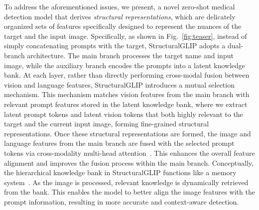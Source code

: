 To address the aforementioned issues, we present\ours, a novel zero-shot medical detection model that derives \textit{structural representations}, which are delicately organized sets of features specifically designed to represent the nuances of the target and the input image. Specifically, as shown in Fig.~\ref{fig:teaser}, instead of simply concatenating prompts with the target, StructuralGLIP adopts a dual-branch architecture. The main branch processes the target name and input image, while the auxiliary branch encodes the prompts into a latent knowledge bank. At each layer, rather than directly performing cross-modal fusion between vision and language features, StructuralGLIP introduces a mutual selection mechanism. This mechanism matches vision features from the main branch with relevant prompt features stored in the latent knowledge bank, where we extract latent prompt tokens and latent vision tokens that both highly relevant to the target and the current input image, forming fine-grained structural representations. Once these structural representations are formed, the image and language features from the main branch are fused with the selected prompt tokens via cross-modality multi-head attention~\citep{vaswani2017attention}. This enhances the overall feature alignment and improves the fusion process within the main branch. Conceptually, the hierarchical knowledge bank in StructuralGLIP functions like a memory system~\citep{bi2021dual, paivio2013imagery}. As the image is processed, relevant knowledge is dynamically retrieved from the bank. This enables the model to better align the image features with the prompt information, resulting in more accurate and context-aware detection.


